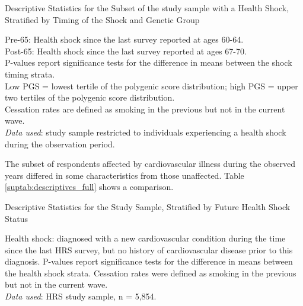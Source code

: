 \captionsetup{format=cancaption,labelformat=cancaptionlabelD, width = \textwidth}
\begin{table}[!ht] \centering
	\caption{Descriptive Statistics for the Subset of the study sample with a Health Shock, Stratified by Timing of the Shock and Genetic Group}
	\label{suptab:descriptive_subgroup}
	
	\begin{flushleft}
			\footnotesize
			Pre-65: Health shock since the last survey reported at ages 60-64.\\
			Post-65: Health shock since the last survey reported at ages 67-70.\\
			P-values report significance tests for the difference in means between the shock timing strata.\\
			Low PGS = lowest tertile of the polygenic score distribution; high PGS = upper two tertiles of the polygenic score distribution.\\
			Cessation rates are defined as smoking in the previous but not in the current wave.\\
			\textit{Data used}: study sample restricted to individuals experiencing a health shock during the observation period.
	\end{flushleft}
\end{table}

The subset of respondents affected by cardiovascular illness during the observed years differed in some characteristics from those unaffected.
Table \ref{suptab:descriptives_full} shows a comparison.

\begin{table}[ht] \centering
	\vspace{-3mm}
	\caption{Descriptive Statistics for the Study Sample, Stratified by Future Health Shock Status}
	\label{suptab:descriptives_full}
	\resizebox{\textwidth}{!}{
	
	}
	\begin{flushleft}
	Health shock: diagnosed with a new cardiovascular condition during the time since the last HRS survey, but no history of cardiovascular disease prior to this diagnosis.
	P-values report significance tests for the difference in means between the health shock strata.
	Cessation rates were defined as smoking in the previous but not in the current wave.\\
	\textit{Data used}: HRS study sample, n = 5,854.
	\end{flushleft}
\end{table}

